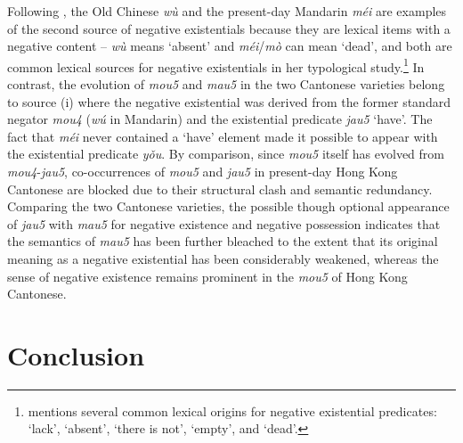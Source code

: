 \documentclass[output=paper,colorlinks,citecolor=brown,chinesefont]{langscibook}
\begin{document}
Following \citet{Veselinova2013}, the Old Chinese \textit{wù} and the present-day Mandarin \textit{méi} are examples of the second source of negative existentials because they are lexical items with a negative content – \textit{wù} means `absent' and \textit{méi}/\textit{mò} can mean `dead', and both are common lexical sources for negative existentials in her typological study.\footnote{\citet{Veselinova2013} mentions several common lexical origins for negative existential predicates: `lack', `absent', `there is not', `empty', and `dead'.} 
In contrast, the evolution of \textit{mou5} and \textit{mau5} in the two Cantonese varieties belong to source (i) where the negative existential was derived from the former standard negator \textit{mou4} (\textit{wú} in Mandarin) and the existential predicate \textit{jau5} `have'. The fact that \textit{méi} never contained a `have' element made it possible to appear with the existential predicate \textit{yǒu}. By comparison, since \textit{mou5} itself has evolved from \textit{mou4}-\textit{jau5}, co-occurrences of \textit{mou5} and \textit{jau5} in present-day Hong Kong Cantonese are blocked due to their structural clash and semantic redundancy. Comparing the two Cantonese varieties, the possible though optional appearance of \textit{jau5} with \textit{mau5} for negative existence and negative possession indicates that the semantics of \textit{mau5} has been further bleached to the extent that its original meaning as a negative existential has been considerably weakened, whereas the sense of negative existence remains prominent in the \textit{mou5} of Hong Kong Cantonese.



\section{Conclusion}\label{s:lam6}
\end{document}
